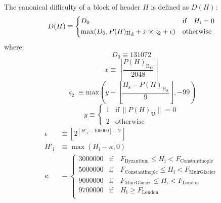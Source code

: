 \documentclass[9pt,oneside]{amsart}
\makeatletter
\newcommand{\linkdest}[1]{\Hy@raisedlink{\hypertarget{#1}{}}}
\makeatother
\begin{document}
\begin{multicols}{2}
\newcommand{\mindifficulty}{D_0}
\newcommand{\homesteadmod}{\ensuremath{\varsigma_2}}
\newcommand{\expdiffsymb}{\ensuremath{\epsilon}}
\newcommand{\diffadjustment}{x}

\hypertarget{block_difficulty_H__d}{}\linkdest{H__d}The canonical difficulty of a block of header $H$ is defined as $D(H)$:
\begin{equation}
D(H) \equiv \begin{dcases}
\mindifficulty & \text{if} \quad H_{\mathrm{i}} = 0\\
\text{max}\!\left(\mindifficulty, {P(H)_{\mathrm{H}}}_{\mathrm{d}} + \diffadjustment\times\homesteadmod + \expdiffsymb \right) & \text{otherwise}\\
\end{dcases}
\end{equation}
where:
\begin{equation}
\mindifficulty \equiv 131072
\end{equation}
\begin{equation}
\diffadjustment \equiv \left\lfloor\frac{{P(H)_{\mathrm{H}}}_{\mathrm{d}}}{2048}\right\rfloor
\end{equation}
\begin{equation}
\homesteadmod \equiv \text{max}\left( y - \left\lfloor\frac{H_{\mathrm{s}} - {P(H)_{\mathrm{H}}}_{\mathrm{s}}}{9}\right\rfloor, -99 \right)
\end{equation}
\begin{equation*}
y \equiv \begin{cases}
1 & \text{if} \, \lVert P(H)_{\mathbf{U}}\rVert = 0 \\
2 & \text{otherwise}
\end{cases}
\end{equation*}
\begin{align}
\expdiffsymb &\equiv \left\lfloor 2^{ \left\lfloor H'_{\mathrm{i}} \div 100000 \right\rfloor - 2 } \right\rfloor \\
H'_{\mathrm{i}} &\equiv \max(H_{\mathrm{i}} - \kappa, 0) \\
\kappa &\equiv \begin{cases} 
  3000000  & \text{if} \quad F_{\mathrm{Byzantium}} \leqslant H_{\mathrm{i}} < F_{\mathrm{Constantinople}} \\
  5000000  & \text{if} \quad F_{\mathrm{Constantinople}} \leqslant H_{\mathrm{i}} < F_{\mathrm{Muir Glacier}} \\
  9000000  & \text{if} \quad F_{\mathrm{Muir Glacier}} \leqslant H_{\mathrm{i}} < F_{\mathrm{London}} \\
  9700000  & \text{if} \quad H_{\mathrm{i}} \geqslant F_{\mathrm{London}} \\
\end{cases}
\end{align}


\end{multicols}
\end{document}
